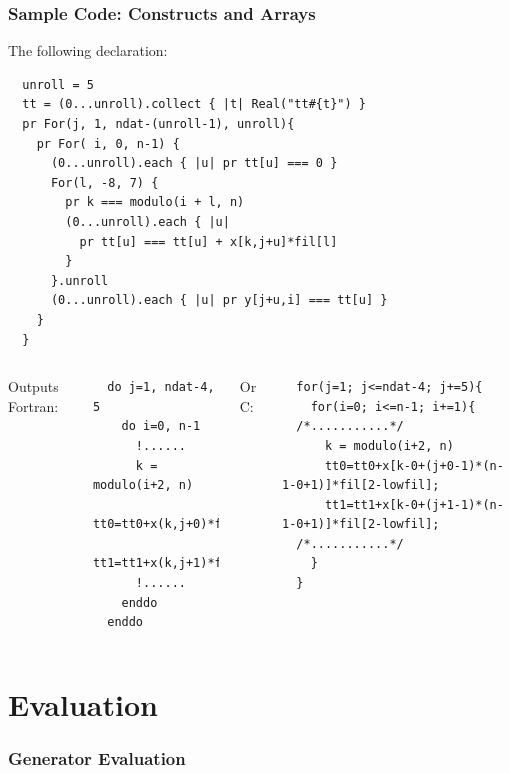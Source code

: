 \documentclass{beamer}
\begin{document}
\begin{frame}[fragile]
\frametitle{Sample Code: Constructs and Arrays}
The following declaration:
\tiny
\lstset{style=BOAST}
\begin{lstlisting}
  unroll = 5
  tt = (0...unroll).collect { |t| Real("tt#{t}") }
  pr For(j, 1, ndat-(unroll-1), unroll){
    pr For( i, 0, n-1) {
      (0...unroll).each { |u| pr tt[u] === 0 }
      For(l, -8, 7) {
        pr k === modulo(i + l, n)
        (0...unroll).each { |u|
          pr tt[u] === tt[u] + x[k,j+u]*fil[l]
        }
      }.unroll
      (0...unroll).each { |u| pr y[j+u,i] === tt[u] }
    }
  }
\end{lstlisting}
\begin{columns}

\normalsize 
Outputs Fortran:
\tiny
\lstset{style=Fortran}
\begin{lstlisting}
  do j=1, ndat-4, 5
    do i=0, n-1
      !......
      k = modulo(i+2, n)
      tt0=tt0+x(k,j+0)*fil(2)
      tt1=tt1+x(k,j+1)*fil(2)
      !......
    enddo
  enddo
\end{lstlisting}
\normalsize
Or C:
\tiny
\lstset{style=C}
\begin{lstlisting}
  for(j=1; j<=ndat-4; j+=5){
    for(i=0; i<=n-1; i+=1){
  /*...........*/
      k = modulo(i+2, n)
      tt0=tt0+x[k-0+(j+0-1)*(n-1-0+1)]*fil[2-lowfil];
      tt1=tt1+x[k-0+(j+1-1)*(n-1-0+1)]*fil[2-lowfil];
  /*...........*/
    }
  }
\end{lstlisting}
\end{columns}
\end{frame}

\section{Evaluation}
\begin{frame}
\frametitle{Generator Evaluation}

\end{frame}
\end{document}
